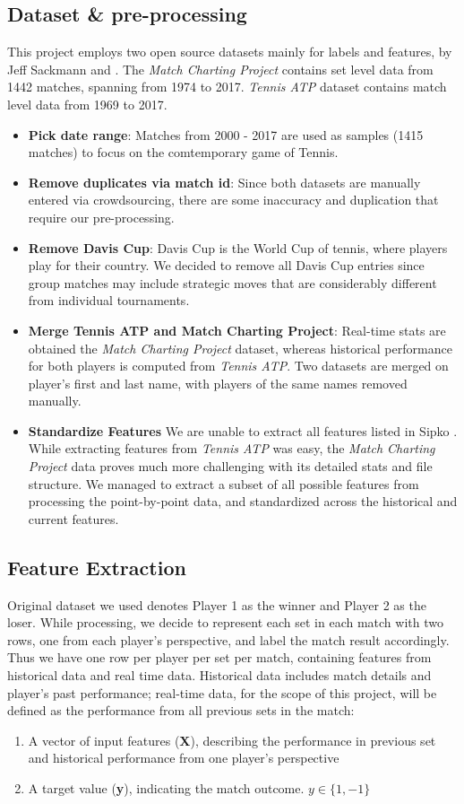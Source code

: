 \documentclass[paper=a4, fontsize=10pt]{scrartcl} %
\numberwithin{equation}{section} %
\numberwithin{figure}{section} %
\numberwithin{table}{section} %
\begin{document}
\subsection{Dataset \& pre-processing}
This project employs two open source datasets mainly for labels and features, by Jeff Sackmann \cite{tennis_atp} and \cite{tennis_charting}. The \textit{Match Charting Project} contains set level data from 1442 matches, spanning from 1974 to 2017. \textit{Tennis ATP} dataset contains match level data from 1969 to 2017.
\begin{itemize}
\item \textbf{Pick date range}: Matches from 2000 - 2017 are used as samples (1415 matches) to focus on the comtemporary game of Tennis.
\item \textbf{Remove duplicates via match id}: Since both datasets are manually entered via crowdsourcing, there are some inaccuracy and duplication that require our pre-processing.
\item \textbf{Remove Davis Cup}: Davis Cup is the World Cup of tennis, where players play for their country.  We decided to remove all Davis Cup entries since group matches may include strategic moves that are considerably different from individual tournaments.
\item \textbf{Merge Tennis ATP and Match Charting Project}: Real-time stats are obtained the \textit{Match Charting Project} dataset, whereas historical performance for both players is computed from \textit{Tennis ATP}. Two datasets are merged on player's first and last name, with players of the same names removed manually.
\item \textbf{Standardize Features} We are unable to extract all features listed in Sipko \cite{tennis1}.  While extracting features from \textit{Tennis ATP} was easy, the \textit{Match Charting Project} data proves much more challenging with its detailed stats and file structure.  We managed to extract a subset of all possible features from processing the point-by-point data, and standardized across the historical and current features.
\end{itemize}
\subsection{Feature Extraction}
\label{sec:label}
Original dataset we used denotes Player 1 as the winner and Player 2 as the loser. While processing, we decide to represent each set in each match with two rows, one from each player's perspective, and label the match result accordingly. Thus we have one row per player per set per match, containing features from historical data and real time data. Historical data includes match details and player's past performance; real-time data, for the scope of this project, will be defined as the performance from all previous sets in the match:
\begin{enumerate}
\item A vector of input features (\textbf{X}), describing the performance in previous set and historical performance from one player's perspective
\item A target value (\textbf{y}), indicating the match outcome. $y \in \{1,-1\}$
\end{enumerate}
\end{document}
